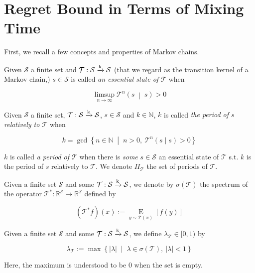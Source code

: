 \documentclass[anon,12pt]{colt2018} %
\newcommand{\AP}[1]{\left(#1\right)}
\newcommand{\AB}[1]{\left[#1\right]}
\newcommand{\APM}[2]{\left(#1\;\middle\vert\;#2\right)}
\newcommand{\ACM}[2]{\left\{#1\;\middle\vert\;#2\right\}}
\newcommand{\Ea}[2]{\underset{#1}{\operatorname{E}}\AB{#2}}
\newcommand{\Nats}{\mathbb{N}}
\newcommand{\Reals}{\mathbb{R}}
\newcommand{\Abs}[1]{\left\vert #1 \right\vert}
\newcommand{\K}{\xrightarrow{\textnormal{k}}}
\newcommand{\St}{\mathcal{S}}
\newcommand{\T}{\mathcal{T}}
\begin{document}
\section{Regret Bound in Terms of Mixing Time}
\label{sec:mixing_time}

First, we recall a few concepts and properties of Markov chains.

\begin{samepage}
\begin{definition}

Given $\St$ a finite set and $\T: \St \K \St$ (that we regard as the transition kernel of a Markov chain,) $s \in \St$ is called \emph{an essential state of $\T$} when

\begin{equation}
\limsup_{n \rightarrow \infty} {\T^n\APM{s}{s}} > 0
\end{equation}

\end{definition}
\end{samepage}

\begin{samepage}
\begin{definition}

Given $\St$ a finite set, $\T: \St \K \St$, $s \in \St$ and $k \in \Nats$, $k$ is called \emph{the period of $s$ relatively to $\T$} when 

\begin{equation}
k = \gcd \ACM{n \in \Nats}{n > 0,\ \T^n(s \mid s) > 0}
\end{equation}

$k$ is called \emph{a period of $\T$} when there is \emph{some} $s \in \St$ an essential state of $\T$ s.t. $k$ is the period of $s$ relatively to $\T$. We denote $\Pi_\T$ the set of periods of $\T$.

\end{definition}
\end{samepage}

Given a finite set $\St$ and some $\T: \St \K \St$, we denote by $\sigma(\T)$ the spectrum of the operator $\T^*: \Reals^\St \rightarrow \Reals^\St$ defined by

\[\AP{\T^*f}(x):=\Ea{y\sim \T(x)}{f(y)}\]

\begin{samepage}
\begin{definition}

Given a finite set $\St$ and some $\T: \St \K \St$, we define $\lambda_\T\in[0,1)$ by

\begin{equation}
\lambda_\T := \max\ACM{\Abs{\lambda}}{\lambda \in \sigma\AP{\T},\ \Abs{\lambda} < 1}
\end{equation}

Here, the maximum is understood to be 0 when the set is empty.

\end{definition}
\end{samepage}
\end{document}
